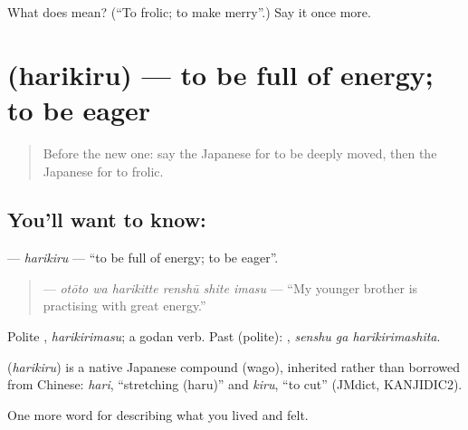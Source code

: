 \begin{tcolorbox}[breakable,colback=teal!4,colframe=teal!35!black,title={Before you move on}]
What does  mean? (\textquotedblleft{}To frolic; to make merry\textquotedblright{}.) Say it once more.
\end{tcolorbox}
\section[\texorpdfstring{\ja{はりきる} (harikiru)}{はりきる (harikiru)}]{ (harikiru) — to be full of energy; to be eager}

\label{lesson:JA-C428-harikiru}



\begin{quote}
Before the new one: say the Japanese for to be deeply moved, then the Japanese for to frolic.
\end{quote}

\subsection*{You'll want to know: }
\textbf{} — \emph{harikiru} — \textquotedblleft{}to be full of energy; to be eager\textquotedblright{}.

\begin{quote}
\textbf{  } — \emph{otōto wa harikitte renshū shite imasu} — \textquotedblleft{}My younger brother is practising with great energy.\textquotedblright{}
\end{quote}

Polite \textbf{}, \emph{harikirimasu}; a godan verb. Past (polite): \textbf{ }, \emph{senshu ga harikirimashita}.

\begin{cousinweb}
\textbf{} (\emph{harikiru}) is a native Japanese compound (wago), inherited rather than borrowed from Chinese: \emph{hari}, \textquotedblleft{}stretching (haru)\textquotedblright{} and \emph{kiru}, \textquotedblleft{}to cut\textquotedblright{} (JMdict, KANJIDIC2).
\end{cousinweb}

\begin{grammarlens}[title={What you've built}]
One more word for describing what you lived and felt.
\end{grammarlens}

